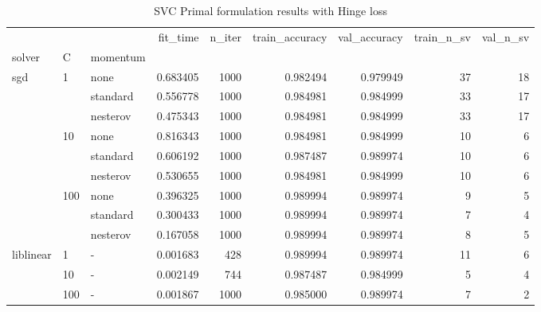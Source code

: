 \begin{table}[H]
\centering
\caption{SVC Primal formulation results with Hinge loss}
\label{primal_svc_hinge_cv_results}
\begin{tabular}{lllrrrrrr}
\toprule
          &     &   &  fit\_time &  n\_iter &  train\_accuracy &  val\_accuracy &  train\_n\_sv &  val\_n\_sv \\
solver & C & momentum &           &         &                 &               &             &           \\
\midrule
sgd & 1   & none &  0.683405 &    1000 &        0.982494 &      0.979949 &          37 &        18 \\
          &     & standard &  0.556778 &    1000 &        0.984981 &      0.984999 &          33 &        17 \\
          &     & nesterov &  0.475343 &    1000 &        0.984981 &      0.984999 &          33 &        17 \\
          & 10  & none &  0.816343 &    1000 &        0.984981 &      0.984999 &          10 &         6 \\
          &     & standard &  0.606192 &    1000 &        0.987487 &      0.989974 &          10 &         6 \\
          &     & nesterov &  0.530655 &    1000 &        0.984981 &      0.984999 &          10 &         6 \\
          & 100 & none &  0.396325 &    1000 &        0.989994 &      0.989974 &           9 &         5 \\
          &     & standard &  0.300433 &    1000 &        0.989994 &      0.989974 &           7 &         4 \\
          &     & nesterov &  0.167058 &    1000 &        0.989994 &      0.989974 &           8 &         5 \\
liblinear & 1   & - &  0.001683 &     428 &        0.989994 &      0.989974 &          11 &         6 \\
          & 10  & - &  0.002149 &     744 &        0.987487 &      0.984999 &           5 &         4 \\
          & 100 & - &  0.001867 &    1000 &        0.985000 &      0.989974 &           7 &         2 \\
\bottomrule
\end{tabular}
\end{table}
